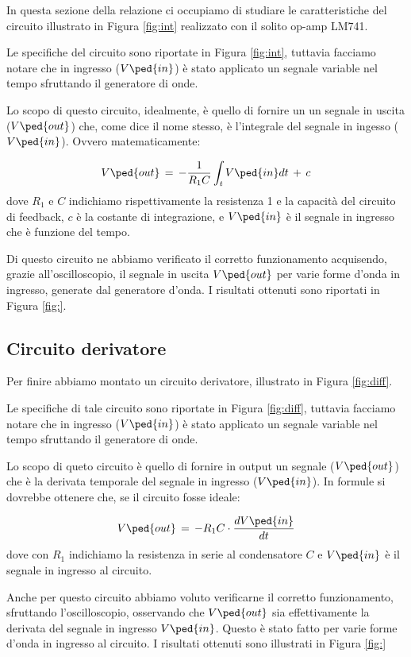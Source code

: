In questa sezione della relazione ci occupiamo di studiare le caratteristiche del circuito illustrato in Figura \ref{fig:int} realizzato con il solito op-amp LM741.

Le specifiche del circuito sono riportate in Figura \ref{fig:int}, tuttavia facciamo notare che in ingresso ($V\ped{in}$) è stato applicato un segnale variable nel tempo sfruttando il generatore di onde.
 
Lo scopo di questo circuito, idealmente, è quello di fornire un un segnale in uscita ($V\ped{out}$) che, come dice il nome stesso, è l'integrale del segnale in ingesso ($V\ped{in}$). Ovvero matematicamente:

\begin{equation}
        V\ped{out}\,=\,-\frac{1}{R_1C} \int_{t}{V\ped{in}dt}\,+\,c
\end{equation}
%
dove $R_1$ e $C$ indichiamo rispettivamente la resistenza 1 e la capacità del circuito di feedback, $c$ è la costante di integrazione, e $V\ped{in}$ è il segnale in ingresso che è funzione del tempo.

Di questo circuito ne abbiamo verificato il corretto funzionamento acquisendo, grazie all'oscilloscopio, il segnale in uscita $V\ped{out}$ per varie forme d'onda in ingresso, generate dal generatore d'onda. I risultati ottenuti sono riportati in Figura \ref{fig:}.

\subsection*{Circuito derivatore}

Per finire abbiamo montato un circuito derivatore, illustrato in Figura \ref{fig:diff}.

Le specifiche di tale circuito sono riportate in Figura \ref{fig:diff}, tuttavia facciamo notare che in ingresso ($V\ped{in}$) è stato applicato un segnale variable nel tempo sfruttando il generatore di onde.

Lo scopo di queto circuito è quello di fornire in output un segnale ($V\ped{out}$) che è la derivata temporale del segnale in ingresso ($V\ped{in}$). In formule si dovrebbe ottenere che, se il circuito fosse ideale:

\begin{equation}
        V\ped{out}\,=\,-R_1C \cdot \frac{dV\ped{in}}{dt}
\end{equation}
%
dove con $R_1$ indichiamo la resistenza in serie al condensatore $C$ e $V\ped{in}$ è il segnale in ingresso al circuito.

Anche per questo circuito abbiamo voluto verificarne il corretto funzionamento, sfruttando l'oscilloscopio, osservando che $V\ped{out}$ sia effettivamente la derivata del segnale in ingresso $V\ped{in}$. Questo è stato fatto per varie forme d'onda in ingresso al circuito. I risultati ottenuti sono illustrati in Figura \ref{fig:}

